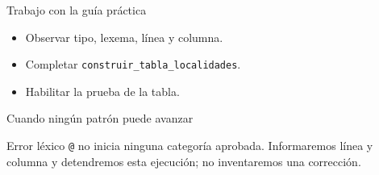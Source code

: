 \documentclass[11pt,spanish]{beamer}
\newcommand{\actividad}[1]{\textbf{\textcolor{Rojo}{#1}}}
\begin{document}
\begin{frame}{Trabajo con la guía práctica}
\vfill
\begin{center}
\end{center}
\bigskip
\begin{itemize}
  \item Observar tipo, lexema, línea y columna.
  \item Completar \texttt{construir\_tabla\_localidades}.
  \item Habilitar la prueba de la tabla.
\end{itemize}
\vfill
\end{frame}

\begin{frame}{Cuando ningún patrón puede avanzar}
\vfill

\begin{center}
\end{center}

\bigskip

\begin{alertblock}{Error léxico}
\texttt{@} no inicia ninguna categoría aprobada. Informaremos línea y columna y detendremos esta ejecución; no inventaremos una corrección.
\end{alertblock}

\vfill
\end{frame}
\end{document}
